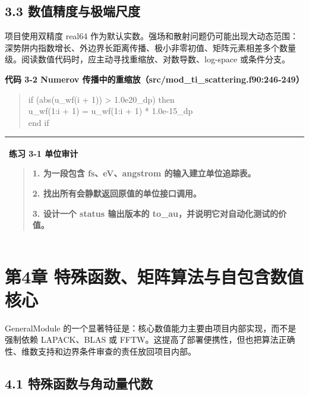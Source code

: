 \documentclass[UTF8,openany,11pt,fontset=fandol]{ctexbook}
\begin{document}
\section{\texorpdfstring{\textbf{3.3
数值精度与极端尺度}}{3.3 数值精度与极端尺度}}\label{ux6570ux503cux7cbeux5ea6ux4e0eux6781ux7aefux5c3aux5ea6}

项目使用双精度 real64
作为默认实数。强场和散射问题仍可能出现大动态范围：深势阱内指数增长、外边界长距离传播、极小非零初值、矩阵元素相差多个数量级。阅读数值代码时，应主动寻找重缩放、对数导数、log-space
或条件分支。

\textbf{代码 3-2 Numerov
传播中的重缩放（src/mod\_ti\_scattering.f90:246-249）}

\begin{quote}
if (abs(u\_wf(i + 1)) \textgreater{} 1.0e20\_dp) then\\
u\_wf(1:i + 1) = u\_wf(1:i + 1) * 1.0e-15\_dp\\
end if
\end{quote}

\begin{longtable}[]{@{}l@{}}
\toprule
\endhead
\begin{minipage}[t]{0.97\columnwidth}\raggedright
\textbf{练习 3-1 单位审计}

\begin{quote}
1. 为一段包含 fs、eV、angstrom 的输入建立单位追踪表。

2. 找出所有会静默返回原值的单位接口调用。

3. 设计一个 status 输出版本的 to\_au，并说明它对自动化测试的价值。
\end{quote}\strut
\end{minipage}\tabularnewline
\bottomrule
\end{longtable}

\chapter{第4章 特殊函数、矩阵算法与自包含数值核心}\label{ux7b2c4ux7ae0-ux7279ux6b8aux51fdux6570ux77e9ux9635ux7b97ux6cd5ux4e0eux81eaux5305ux542bux6570ux503cux6838ux5fc3}

GeneralModule
的一个显著特征是：核心数值能力主要由项目内部实现，而不是强制依赖
LAPACK、BLAS 或
FFTW。这提高了部署便携性，但也把算法正确性、维数支持和边界条件审查的责任放回项目内部。

\section{\texorpdfstring{\textbf{4.1
特殊函数与角动量代数}}{4.1 特殊函数与角动量代数}}\label{ux7279ux6b8aux51fdux6570ux4e0eux89d2ux52a8ux91cfux4ee3ux6570}
\end{document}
